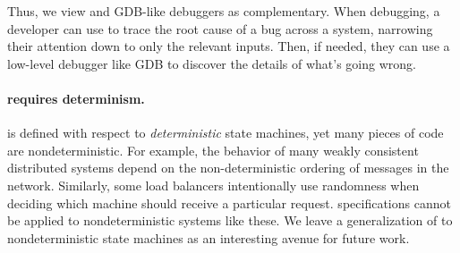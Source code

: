 Thus, we view \watprovenance{} and GDB-like debuggers as complementary. When
debugging, a developer can use \watprovenance{} to trace the root cause of a
bug across a system, narrowing their attention down to only the relevant
inputs. Then, if needed, they can use a low-level debugger like GDB to discover
the details of what's going wrong.

\paragraph{\Watprovenance{} requires determinism.}
\Watprovenance{} is defined with respect to \emph{deterministic} state
machines, yet many pieces of code are nondeterministic. For example, the
behavior of many weakly consistent distributed systems depend on the
non-deterministic ordering of messages in the network. Similarly, some load
balancers intentionally use randomness when deciding which machine should
receive a particular request.
%
\Watprovenance{} specifications cannot be applied to nondeterministic systems
like these. We leave a generalization of \watprovenance{} to nondeterministic
state machines as an interesting avenue for future work.
